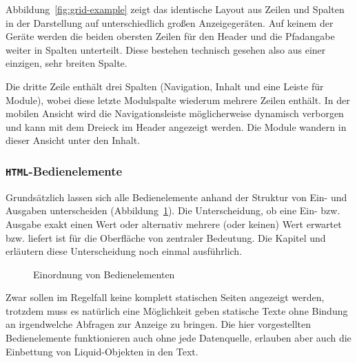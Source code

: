 Abbildung~\ref{fig:grid-example} zeigt das identische Layout aus Zeilen und Spalten in der Darstellung auf unterschiedlich großen Anzeigegeräten. Auf keinem der Geräte werden die beiden obersten Zeilen für den Header und die Pfadangabe weiter in Spalten unterteilt. Diese bestehen technisch gesehen also aus einer einzigen, sehr breiten Spalte.

Die dritte Zeile enthält drei Spalten (Navigation, Inhalt und eine Leiste für Module), wobei diese letzte Modulspalte wiederum mehrere Zeilen enthält. In der mobilen Ansicht wird die Navigationsleiste möglicherweise dynamisch verborgen und kann mit dem Dreieck im Header angezeigt werden. Die Module wandern in dieser Ansicht unter den Inhalt.

\subsubsection{\texttt{HTML}-Bedienelemente}

Grundsätzlich lassen sich alle Bedienelemente anhand der Struktur von Ein- und Ausgaben unterscheiden (Abbildung~\ref{fig:ui-element-concept}). Die Unterscheidung, ob eine Ein- bzw. Ausgabe exakt einen Wert oder alternativ mehrere (oder keinen) Wert erwartet bzw. liefert ist für die Oberfläche von zentraler Bedeutung. Die Kapitel  und  erläutern diese Unterscheidung noch einmal ausführlich.

\begin{figure}[h]
  \centering 
  \caption{Einordnung von Bedienelementen}
  \label{fig:ui-element-concept}
\end{figure}

Zwar sollen im Regelfall keine komplett statischen Seiten angezeigt werden, trotzdem muss es natürlich eine Möglichkeit geben statische Texte ohne Bindung an irgendwelche Abfragen zur Anzeige zu bringen. Die hier vorgestellten Bedienelemente funktionieren auch ohne jede Datenquelle, erlauben aber auch die Einbettung von Liquid-Objekten in den Text.

